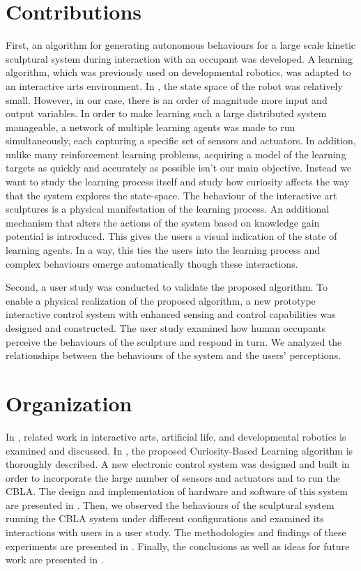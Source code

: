 \section{Contributions}

First, an algorithm for generating autonomous behaviours for a large scale kinetic sculptural system during interaction with an occupant was developed. A learning algorithm, which was previously used on developmental robotics, was adapted to an interactive arts environment. In \cite{Oudeyer2007}, the state space of the robot was relatively small. However, in our case, there is an order of magnitude more input and output variables. In order to make learning such a large distributed system manageable, a network of multiple learning agents was made to run simultaneously, each capturing a specific set of sensors and actuators. In addition, unlike many reinforcement learning problems, acquiring a model of the learning targets as quickly and accurately as possible isn't our main objective. Instead we want to study the learning process itself and study how curiosity affects the way that the system explores the state-space. The behaviour of the interactive art sculptures is a physical manifestation of the learning process. An additional mechanism that alters the actions of the system based on knowledge gain potential is introduced. This gives the users a visual indication of the state of learning agents. In a way, this ties the users into the learning process and complex behaviours emerge automatically though these interactions. 

Second, a user study was conducted to validate the proposed algorithm. To enable a physical realization of the proposed algorithm, a new prototype interactive control system with enhanced sensing and control capabilities was designed and constructed. The user study examined how human occupants perceive the behaviours of the sculpture and respond in turn. We analyzed the relationships between the behaviours of the system and the users' perceptions. 


\section{Organization}

In , related work in interactive arts, artificial life, and developmental robotics is examined and discussed. In , the proposed Curiosity-Based Learning algorithm is thoroughly described. A new electronic control system was designed and built in order to incorporate the large number of sensors and actuators and to run the CBLA. The design and implementation of hardware and software of this system are presented in . Then, we observed the behaviours of the sculptural system running the CBLA system under different configurations and examined its interactions with users in a user study. The methodologies and findings of these experiments are presented in . Finally, the conclusions as well as ideas for future work are presented in .
